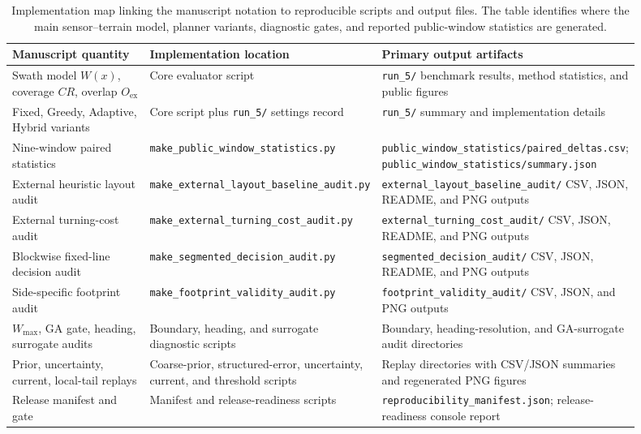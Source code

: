 \documentclass[jmse,article,submit,moreauthors]{Definitions/mdpi}
\begin{document}
\begin{table}[!htbp]
	\centering
	\caption{Implementation map linking the manuscript notation to reproducible scripts and output files. The table identifies where the main sensor--terrain model, planner variants, diagnostic gates, and reported public-window statistics are generated.}
	\label{tab:implementation_map}
	\tiny
	\renewcommand{\arraystretch}{1.10}
	\setlength{\tabcolsep}{2.0pt}
	\begin{tabular}{@{}p{0.24\linewidth}p{0.32\linewidth}p{0.34\linewidth}@{}}
		\toprule[1bp]
		\textbf{Manuscript quantity} & \textbf{Implementation location} & \textbf{Primary output artifacts} \\
		\midrule[1bp]
		Swath model \(W(x)\), coverage \(CR\), overlap \(O_{\mathrm{ex}}\) & Core evaluator script & \texttt{run\_5/} benchmark results, method statistics, and public figures \\
		Fixed, Greedy, Adaptive, Hybrid variants & Core script plus \texttt{run\_5/} settings record & \texttt{run\_5/} summary and implementation details \\
		Nine-window paired statistics & \texttt{make\_public\_window\_statistics.py} & \texttt{public\_window\_statistics/paired\_deltas.csv}; \texttt{public\_window\_statistics/summary.json} \\
		External heuristic layout audit & \texttt{make\_external\_layout\_baseline\_audit.py} & \texttt{external\_layout\_baseline\_audit/} CSV, JSON, README, and PNG outputs \\
		External turning-cost audit & \texttt{make\_external\_turning\_cost\_audit.py} & \texttt{external\_turning\_cost\_audit/} CSV, JSON, README, and PNG outputs \\
		Blockwise fixed-line decision audit & \texttt{make\_segmented\_decision\_audit.py} & \texttt{segmented\_decision\_audit/} CSV, JSON, README, and PNG outputs \\
		Side-specific footprint audit & \texttt{make\_footprint\_validity\_audit.py} & \texttt{footprint\_validity\_audit/} CSV, JSON, and PNG outputs \\
		\(W_{\max}\), GA gate, heading, surrogate audits & Boundary, heading, and surrogate diagnostic scripts & Boundary, heading-resolution, and GA-surrogate audit directories \\
		Prior, uncertainty, current, local-tail replays & Coarse-prior, structured-error, uncertainty, current, and threshold scripts & Replay directories with CSV/JSON summaries and regenerated PNG figures \\
		Release manifest and gate & Manifest and release-readiness scripts & \texttt{reproducibility\_manifest.json}; release-readiness console report \\
		\bottomrule[1bp]
	\end{tabular}
\end{table}
\end{document}
